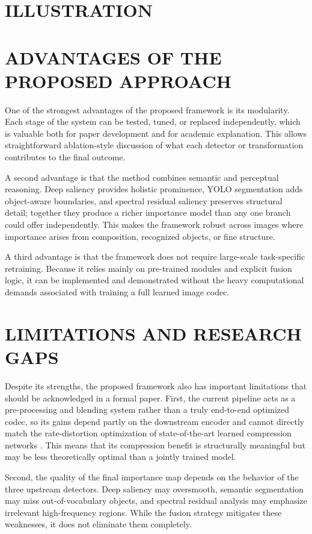 \documentclass[11pt,                                                             
 superscriptaddress,twoside,
 amsmath,amssymb,
 aps, physrev
]{revtex4-2}
\begin{document}
\section{ILLUSTRATION}

\section{ADVANTAGES OF THE PROPOSED APPROACH}
One of the strongest advantages of the proposed framework is its modularity. Each stage of the system can be tested, tuned, or replaced independently, which is valuable both for paper development and for academic explanation. This allows straightforward ablation-style discussion of what each detector or transformation contributes to the final outcome.

A second advantage is that the method combines semantic and perceptual reasoning. Deep saliency provides holistic prominence, YOLO segmentation adds object-aware boundaries, and spectral residual saliency preserves structural detail; together they produce a richer importance model than any one branch could offer independently. This makes the framework robust across images where importance arises from composition, recognized objects, or fine structure.

A third advantage is that the framework does not require large-scale task-specific retraining. Because it relies mainly on pre-trained modules and explicit fusion logic, it can be implemented and demonstrated without the heavy computational demands associated with training a full learned image codec.

\section{LIMITATIONS AND RESEARCH GAPS}
Despite its strengths, the proposed framework also has important limitations that should be acknowledged in a formal paper. First, the current pipeline acts as a pre-processing and blending system rather than a truly end-to-end optimized codec, so its gains depend partly on the downstream encoder and cannot directly match the rate-distortion optimization of state-of-the-art learned compression networks \cite{li2024ieee}. This means that its compression benefit is structurally meaningful but may be less theoretically optimal than a jointly trained model.

Second, the quality of the final importance map depends on the behavior of the three upstream detectors. Deep saliency may oversmooth, semantic segmentation may miss out-of-vocabulary objects, and spectral residual analysis may emphasize irrelevant high-frequency regions. While the fusion strategy mitigates these weaknesses, it does not eliminate them completely.
\end{document}
